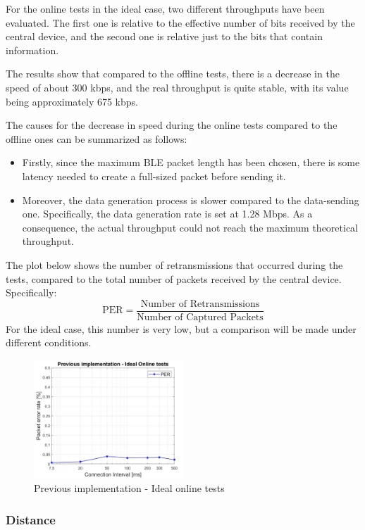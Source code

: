 \documentclass{Configuration_Files/PoliMi3i_thesis}
\begin{document}
For the online tests in the ideal case, two different throughputs have been evaluated. The first one is relative to the effective number of bits received by the central device, and the second one is relative just to the bits that contain information.

The results show that compared to the offline tests, there is a decrease in the speed of about 300 kbps, and the real throughput is quite stable, with its value being approximately 675 kbps.

The causes for the decrease in speed during the online tests compared to the offline ones can be summarized as follows:
\begin{itemize}
    \item Firstly, since the maximum BLE packet length has been chosen, there is some latency needed to create a full-sized packet before sending it.
    \item Moreover, the data generation process is slower compared to the data-sending one. Specifically, the data generation rate is set at 1.28 Mbps. As a consequence, the actual throughput could not reach the maximum theoretical throughput.
\end{itemize}

The plot below shows the number of retransmissions that occurred during the tests, compared to the total number of packets received by the central device. Specifically:
\[
\text{PER} = \frac{\text{Number of Retransmissions}}{\text{Number of Captured Packets}}
\]
For the ideal case, this number is very low, but a comparison will be made under different conditions.

\begin{figure}[H]
    \centering
    \includegraphics[width=0.5\textwidth]{Results Manuel/figure3}
    \caption{Previous implementation - Ideal online tests}
    \label{manuel_results_3}
\end{figure}

\subsubsection*{Distance}
\end{document}
